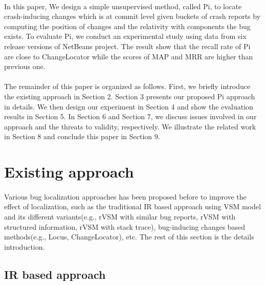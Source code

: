 \documentclass[a4paper]{article}
\begin{document}
\paragraph{}
In this paper, We design a simple unsupervised method, called Pi, to locate crash-inducing changes which is at commit level given buckets of crash reports by computing the position of changes and the relativity with components the bug exists. To evaluate Pi, we conduct an experimental study using data from six release versions of NetBeans project. The result show that the recall rate of Pi are close to ChangeLocator while the scores of MAP and MRR are higher than previous one.
\vspace{-1em}

\paragraph{}
The remainder of this paper is organized as follows. First, we briefly introduce the existing approach in Section 2. Section 3 presents our proposed Pi approach in details. We then design our experiment in Section 4 and show the evaluation results in Section 5. In Section 6 and Section 7, we discuss issues involved in our approach and the threats to validity, respectively. We illustrate the related work in Section 8 and conclude this paper in Section 9.
\vspace{-1em}


\section{Existing approach}

\paragraph{}
Various bug localization approaches has been proposed before to improve the effect of localization, such as the traditional IR based approach using VSM model and its different variants(e.g., rVSM with similar bug reports\cite{BugLocator}, rVSM with structured information\cite{BLUiR}, rVSM with stack trace\cite{BRTracer}), bug-inducing changes based methods(e.g., Locus\cite{Locus}, ChangeLocator\cite{ChangeLocator}), etc. The rest of this section is the details introduction.
\vspace{-1em}

\subsection{IR based approach}
\end{document}
